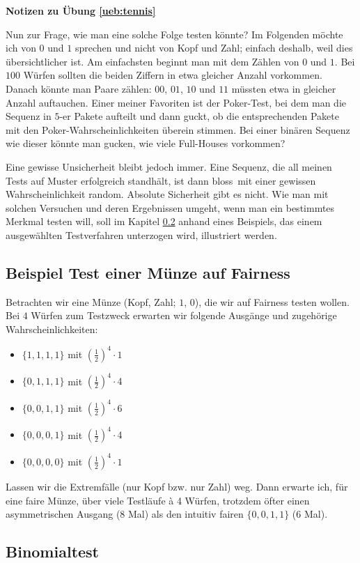 \documentclass[%
<<<<<<< Updated upstream
<<<<<<< Updated upstream
11pt,%
twoside,%
titlepage,%
german,%
=======
=======
>>>>>>> Stashed changes
11pt,%
twoside,%
titlepage,%
swissgerman,%
<<<<<<< Updated upstream
>>>>>>> Stashed changes
=======
>>>>>>> Stashed changes
headsepline%
]{scrartcl}
\newcommand{\faReturnGray}{\textcolor{gray}{\faMailReply}} %
\theoremstyle{definition}
\theoremstyle{plain}
\newcommand{\concatueb}[1]{ueb:#1}%
\newcommand{\concatlsg}[1]{lsg:#1}%
\newenvironment{lsg}[1]{%
    \par\noindent\textbf{Notizen zu Übung \ref{\concatueb{#1}}}\label{\concatlsg{#1}}
    \hfill\hyperref[\concatueb{#1}]{\faReturnGray}\par %
}{%
    \par%
}
\newcommand{\concatueb}[1]{ueb:#1}%
\newcommand{\concatlsg}[1]{lsg:#1}%
\newenvironment{lsg}[1]{%
    \par\noindent\textbf{Notizen zu Übung \ref{\concatueb{#1}}.}%
    \label{\concatlsg{#1}}
}{%
    \par%
}
\begin{document}
\begin{lsg}{tennis}
Nun zur Frage, wie man eine solche Folge testen könnte?
Im Folgenden möchte ich von $0$ und $1$ sprechen und nicht von Kopf und Zahl; einfach deshalb, weil dies übersichtlicher ist.
Am einfachsten beginnt man mit dem Zählen von $0$ und $1$. Bei $100$ Würfen sollten die beiden Ziffern in etwa gleicher Anzahl vorkommen. Danach könnte man Paare zählen: $00$, $01$, $10$ und $11$ müssten etwa in gleicher Anzahl auftauchen. Einer meiner Favoriten ist der Poker-Test, bei dem man die Sequenz in $5$-er Pakete aufteilt und dann guckt, ob die entsprechenden Pakete mit den Poker-Wahrscheinlichkeiten überein stimmen. Bei einer binären Sequenz wie dieser könnte man gucken, wie viele Full-Houses vorkommen?\par
Eine gewisse Unsicherheit bleibt jedoch immer. Eine Sequenz, die all meinen Tests auf Muster erfolgreich standhält, ist dann \glqq bloss\grqq\ mit einer gewissen Wahrscheinlichkeit random. Absolute Sicherheit gibt es nicht. Wie man mit solchen Versuchen und deren Ergebnissen umgeht, wenn man ein bestimmtes Merkmal testen will, soll im Kapitel \ref{subsec:bspfreiw} anhand eines Beispiels, das einem ausgewählten Testverfahren unterzogen wird, illustriert werden.

\subsection{Beispiel Test einer Münze auf Fairness}

Betrachten wir eine Münze (Kopf, Zahl; $1$, $0$), die wir auf Fairness testen wollen. Bei $4$ Würfen zum Testzweck erwarten wir folgende Ausgänge und zugehörige Wahrscheinlichkeiten:
\begin{itemize}
    \item $\{1,1,1,1\}$ mit $(\tfrac{1}{2})^4\cdot1$
    \item $\{0,1,1,1\}$ mit $(\tfrac{1}{2})^4\cdot4$
    \item $\{0,0,1,1\}$ mit $(\tfrac{1}{2})^4\cdot6$
    \item $\{0,0,0,1\}$ mit $(\tfrac{1}{2})^4\cdot4$
    \item $\{0,0,0,0\}$ mit $(\tfrac{1}{2})^4\cdot1$
\end{itemize}

Lassen wir die Extremfälle (nur Kopf bzw. nur Zahl) weg. Dann erwarte ich, für eine faire Münze, über viele Testläufe à 4 Würfen, trotzdem öfter einen asymmetrischen Ausgang (8 Mal) als den intuitiv fairen $\{0,0,1,1\}$ (6 Mal).

\subsection{Binomialtest}\label{subsec:bspfreiw}


\end{lsg}
\end{document}
